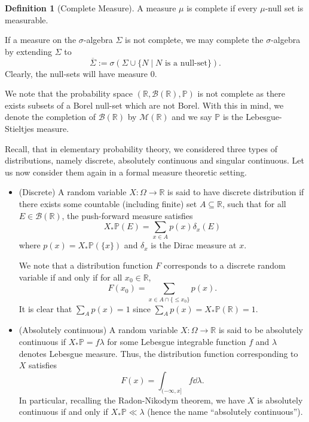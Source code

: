 \documentclass[]{article}
\theoremstyle{definition}
\theoremstyle{definition}
\newtheorem{definition}{Definition}[section]
\begin{document}
\begin{definition}[Complete Measure]
  A measure \(\mu\) is complete if every \(\mu\)-null set is measurable.
\end{definition}

If a measure on the \(\sigma\)-algebra \(\Sigma\) is not complete, we may complete 
the \(\sigma\)-algebra by extending \(\Sigma\) to 
\[\overline{\Sigma} := \sigma(\Sigma \cup \{N \mid N \text{ is a null-set}\}).\]
Clearly, the null-sets will have measure 0. 

We note that the probability space \((\mathbb{R}, \mathcal{B}(\mathbb{R}), \mathbb{P})\) 
is not complete as there exists subsets of a Borel null-set which are not Borel. 
With this in mind, we denote the completion of \(\mathcal{B}(\mathbb{R})\) by 
\(\mathcal{M}(\mathbb{R})\) and we say \(\mathbb{P}\) is the Lebesgue-Stieltjes 
measure.

Recall, that in elementary probability theory, we considered three types of 
distributions, namely discrete, absolutely continuous and singular continuous.
Let us now consider them again in a formal measure theoretic setting. 

\begin{itemize}
  \item (Discrete) A random variable \(X : \Omega \to \mathbb{R}\) is said to 
    have discrete distribution if there exists some countable (including finite) 
    set \(A \subseteq \mathbb{R}\), such that for all \(E \in \mathcal{B}(\mathbb{R})\), 
    the push-forward measure satisfies 
    \[X_*\mathbb{P}(E) = \sum_{x \in A} p(x) \delta_x(E)\]
    where \(p(x) = X_*\mathbb{P}(\{x\})\) and \(\delta_x\) is the 
    Dirac measure at \(x\).

    We note that a distribution function \(F\) corresponds to a discrete random variable 
    if and only if for all \(x_0 \in \mathbb{R}\), 
    \[F(x_0) = \sum_{x \in A \cap \{\le x_0\}} p(x).\]
    It is clear that \(\sum_A p(x) = 1\) since \(\sum_A p(x) = X_*\mathbb{P}(\mathbb{R}) = 1\).
  \item (Absolutely continuous) A random variable \(X : \Omega \to \mathbb{R}\) is 
    said to be absolutely continuous if \(X_* \mathbb{P} = f \lambda\) for 
    some Lebesgue integrable function \(f\) and \(\lambda\) denotes Lebesgue measure.
    Thus, the distribution function corresponding to \(X\) satisfies 
    \[F(x) = \int_{(-\infty, x]} f \dd \lambda.\]
    In particular, recalling the Radon-Nikodym theorem, we have \(X\) is absolutely 
    continuous if and only if \(X_*\mathbb{P} \ll \lambda\) (hence the name ``absolutely continuous'').
\end{itemize}
\end{document}
